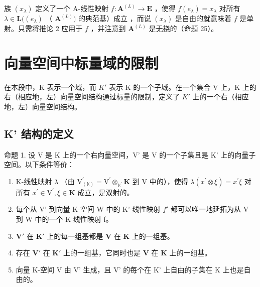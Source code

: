 族 \((x_{\lambda})\) 定义了一个 A-线性映射 \(f: \mathbf{A}^{(L)} \to \mathbf{E}\) ，使得 \(f(e_{\lambda}) = x_{\lambda}\) 对所有 \(\lambda \in \mathbf{L}((e_{\lambda})\) （ \(\mathbf{A}^{(L)})\) 的典范基）成立 ，而说 \((x_{\lambda})\) 是自由的就意味着 \(f\) 是单射。只需将推论 2 应用于 \(f\) ，并注意到 \(\mathbf{A}^{(L)}\) 是无挠的（命题 25）。

\section{向量空间中标量域的限制}

在本段中，K 表示一个域，而 \(K'\) 表示 K 的一个子域。在一个集合 V 上，K 上的右（相应地，左）向量空间结构通过标量的限制，定义了 \(K'\) 上的一个右（相应地，左）向量空间结构。

\subsection{K' 结构的定义}

命题 1. 设 V 是 K 上的一个右向量空间，V' 是 V 的一个子集且是 K' 上的向量子空间。以下条件等价：

\begin{enumerate}
\def\labelenumi{(\alph{enumi})}
\item
  K-线性映射 \(\lambda\) （由 \(\mathrm{V}_{(\mathbb{K})}^{\prime} = \mathrm{V}^{\prime}\otimes_{\mathbb{K}^{\prime}}\mathbf{K}\) 到 V 中的），使得 \(\lambda (x^{\prime}\otimes \xi) = x^{\prime}\xi\) 对所有 \(x^{\prime}\in \mathrm{V}^{\prime},\xi \in \mathbf{K}\) 成立，是双射的。
\item
  每个从 V' 到向量 K-空间 W 中的 K'-线性映射 \(f'\) 都可以唯一地延拓为从 V 到 W 中的一个 K-线性映射 f。
\item
  \(\mathbf{V}'\) 在 \(\mathbf{K}'\) 上的每一组基都是 \(\mathbf{V}\) 在 \(\mathbf{K}\) 上的一组基。
\item
  存在 \(\mathbf{V}'\) 在 \(\mathbf{K}'\) 上的一组基，它同时也是 \(\mathbf{V}\) 在 \(\mathbf{K}\) 上的一组基。
\item
  向量 K-空间 V 由 V' 生成，且 V' 的每个在 K' 上自由的子集在 K 上也是自由的。
\end{enumerate}


